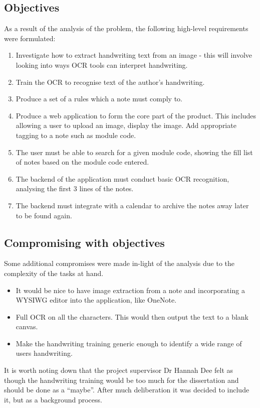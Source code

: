 \subsection{Objectives}
As a result of the analysis of the problem, the following high-level requirements were formulated:
\begin{enumerate}
	\item Investigate how to extract handwriting text from an image - this will involve looking into ways OCR tools can interpret handwriting.
	\item Train the OCR to recognise text of the author's handwriting.
	\item Produce a set of a rules which a note must comply to.
	\item Produce a web application to form the core part of the product. This includes allowing a user to upload an image, display the image. Add appropriate tagging to a note such as module code.
	\item The user must be able to search for a given module code, showing the fill list of notes based on the module code entered.
	\item The backend of the application must conduct basic OCR recognition, analysing the first 3 lines of the notes.
	\item The backend must integrate with a calendar to archive the notes away later to be found again.
\end{enumerate}

\subsection{Compromising with objectives}
Some additional compromises were made in-light of the analysis due to the complexity of the tasks at hand.
\begin{itemize}
	\item It would be nice to have image extraction from a note and incorporating a WYSIWG editor into the application, like OneNote.
	\item Full OCR on all the characters. This would then output the text to a blank canvas.
	\item Make the handwriting training generic enough to identify a wide range of users handwriting.
\end{itemize}

It is worth noting down that the project supervisor Dr Hannah Dee felt as though the handwriting training would be too much for the dissertation and should be done as a ``maybe''. After much deliberation it was decided to include it, but as a background process.

